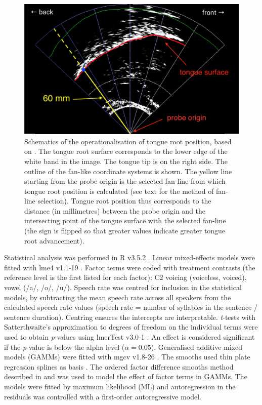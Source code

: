 \documentclass[preprint]{JASAnew}
\begin{document}
\begin{figure}
  \centering
  \includegraphics[width=5in]{Figure1.png}
  \caption{Schematics of the operationalisation of tongue root position, based on \citet{kirkham2017}. The tongue root surface corresponds to the lower edge of the white band in the image. The tongue tip is on the right side. The outline of the fan-like coordinate systems is shown. The yellow line starting from the probe origin is the selected fan-line from which tongue root position is calculated (see text for the method of fan-line selection). Tongue root position thus corresponds to the distance (in millimetres) between the probe origin and the intersecting point of the tongue surface with the selected fan-line (the sign is flipped so that greater values indicate greater tongue root advancement).}
  \label{f:trp}
\end{figure}

Statistical analysis was performed in R v3.5.2 \citep{r-core-team2018}.
Linear mixed-effects models were fitted with lme4 v1.1-19
\citep{bates2015}. Factor terms were coded with treatment contrasts (the
reference level is the first listed for each factor): C2 voicing
(voiceless, voiced), vowel (/a/, /o/, /u/). Speech rate was centred for
inclusion in the statistical models, by subtracting the mean speech rate
across all speakers from the calculated speech rate values (speech rate
= number of syllables in the sentence / sentence duration). Centring
ensures the intercepts are interpretable. \emph{t}-tests with
Satterthwaite's approximation to degrees of freedom on the individual
terms were used to obtain \emph{p}-values using lmerTest v3.0-1
\citep{kuznetsova2017, luke2017}. An effect is considered significant if
the \emph{p}-value is below the alpha level (\(\alpha = 0.05\)).
Generalised additive mixed models (GAMMs) were fitted with mgcv v1.8-26
\citep{wood2011, wood2017}. The smooths used thin plate regression
splines as basis \citep{wood2003}. The ordered factor difference smooths
method described in \citet{soskuthy2017} and \citet{wieling2018} was
used to model the effect of factor terms in GAMMs. The models were
fitted by maximum likelihood (ML) and autoregression in the residuals
was controlled with a first-order autoregressive model.
\end{document}

